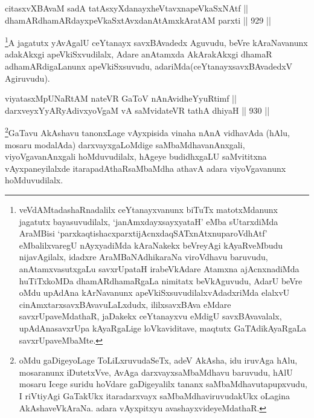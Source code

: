 
\begin{shl}
citasxvXBAvaM sadA tatAsxyXdanayxheVtavxnapeVkaSxNAtf ||  \\
dhamARdhamARdayxpeVkaSxtAvxdanAtAmxkAratAM parxti \hfill || 929 ||  
\end{shl}

\begin{artha}
\footnote{veVdAMtadashaRnadalilx ceYtanayxvanunx biTuTx matotxMdanunx jagatutx bayasuvudilalx, `janAmxdayxsayxyataH' eMba sUtarxdiMda AraMBisi `parxkaqtishacxparxtijAcnxdaqSATxnAtxnuparoVdhAtf' eMbalilxvaregU nAyxyadiMda kAraNakekx beVreyAgi kAyaRveMbudu nijavAgilalx, idadxre AraMBaNAdhikaraNa viroVdhavu baruvudu, anAtamxvasutxgaLu savxrUpataH irabeVkAdare Atamxna ajAcnxnadiMda huTiTxkoMDa dhamARdhamaRgaLa nimitatx beVkAguvudu, AdarU beVre oMdu upAdAna kArNavanunx apeVkiSxsuvudilalxvAdadxriMda elalxvU cinAmxtarxsavxBAvavuLaLxdudx, ililxsavxBAva eMdare savxrUpaveMdathaR, jaDakekx ceYtanayxvu eMdigU savxBAvavalalx, upAdAnasavxrUpa kAyaRgaLige loVkaviditave, maqtutx GaTAdikAyaRgaLa savxrUpaveMbaMte.}A jagatutx yAvAgalU ceYtanayx savxBAvadedx Aguvudu, beVre kAraNavanunx adakAkxgi apeVkiSxvudilalx, Adare anAtamxda AkArakAkxgi dhamaR adhamARdigaLanunx apeVkiSxsuvudu, adariMda(ceYtanayxsavxBAvadedxV Agiruvudu).
\end{artha}


\begin{shl}
viyatasxMpUNaRtAM nateVR GaToV nAnAvidheYyuRtimf || \\
darxveyxYyARyAdivxyoVgaM vA saMvidateVR tathA dhiyaH \hfill || 930 ||  
\end{shl}

\begin{artha}
\footnote{oMdu gaDigeyoLage ToLiLxruvudaSeTx, adeV AkAsha, idu iruvAga hAlu, mosaranunx iDutetxVve, AvAga darxvayxsaMbaMdhavu baruvudu, hAlU mosaru Icege suridu hoVdare gaDigeyalilx tananx saMbaMdhavutapupxvudu, I riVtiyAgi GaTakUkx itaradarxvayx saMbaMdhaviruvudakUkx oLagina AkAshaveVkAraNa. adara vAyxpitxyu avashayxvideyeMdathaR.}GaTavu AkAshavu tanonxLage vAyxpisida vinaha nAnA vidhavAda (hAlu, mosaru modalAda) darxvayxgaLoMdige saMbaMdhavanAnxgali, viyoVgavanAnxgali hoMduvudilalx, hAgeye budidhxgaLU saMvititxna vAyxpaneyilalxde itarapadAthaRsaMbaMdha athavA adara viyoVgavanunx hoMduvudilalx.
\end{artha}


